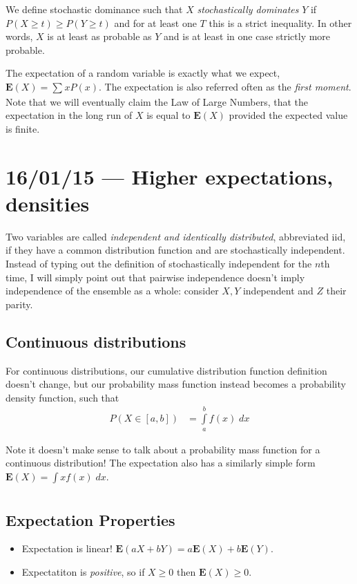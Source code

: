 \documentclass[10pt]{report}
\begin{document}
We define stochastic dominance such that $X$ \emph{stochastically dominates} $Y$ if $P(X \geq t) \geq P(Y \geq t)$ and for at least one $T$ this is a strict inequality. In other words, $X$ is at least as probable as $Y$ and is at least in one case strictly more probable.

The expectation of a random variable is exactly what we expect, $\mathbf{E}(X) = \sum\limits_{}^{}x P(x)$. The expectation is also referred often as the \emph{first moment}. Note that we will eventually claim the Law of Large Numbers, that the expectation in the long run of $X$ is equal to $\mathbf{E}(X)$ provided the expected value is finite. 

\chapter{16/01/15 --- Higher expectations, densities}

Two variables are called \emph{independent and identically distributed}, abbreviated iid, if they have a common distribution function and are stochastically independent. Instead of typing out the definition of stochastically independent for the $n$th time, I will simply point out that pairwise independence doesn't imply independence of the ensemble as a whole: consider $X,Y$ independent and $Z$ their parity.

\section{Continuous distributions}

For continuous distributions, our cumulative distribution function definition doesn't change, but our probability mass function instead becomes a probability density function, such that 
\begin{align}
    P(X \in [a,b]) &= \int\limits_{a}^{b}f(x)\;dx
\end{align}

Note it doesn't make sense to talk about a probability mass function for a continuous distribution! The expectation also has a similarly simple form $\mathbf{E}(X) = \int\limits_{}^{}xf(x)\;dx$. 

\section{Expectation Properties}

\begin{itemize}
    \item Expectation is linear! $\mathbf{E}(aX + bY) = a\mathbf{E}(X) + b\mathbf{E}(Y)$. 
    \item Expectatiton is \emph{positive}, so if $X \geq 0$ then $\mathbf{E}(X) \geq 0$.
\end{itemize}
\end{document}

